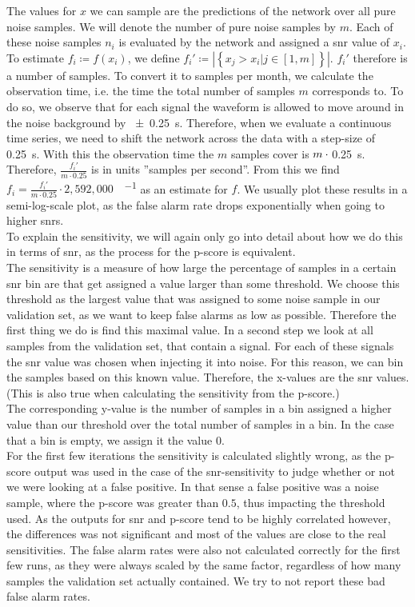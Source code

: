 The values for $x$ we can sample are the predictions of the network over all pure noise samples. We will denote the number of pure noise samples by $m$. Each of these noise samples $n_i$ is evaluated by the network and assigned a \gls{snr} value of $x_i$. To estimate $f_i\coloneqq f(x_i)$, we define $f_i'\coloneqq \left|\left\{ x_j > x_i | j\in \left[1, m\right]\right\}\right|$. $f_i'$ therefore is a number of samples. To convert it to samples per month, we calculate the observation time, i.e. the time the total number of samples $m$ corresponds to. To do so, we observe that for each signal the waveform is allowed to move around in the noise background by \SI{\pm 0.25}{\s}. Therefore, when we evaluate a continuous time series, we need to shift the network across the data with a step-size of \SI{0.25}{\s}. With this the observation time the $m$ samples cover is $m\cdot\vphantom{0.25}$\SI{0.25}{\s}. Therefore, $\frac{f_i'}{m\cdot 0.25}$ is in units ''samples per second''. From this we find $f_i=\frac{f_i'}{m\cdot 0.25}\cdot2,592,000$\SI[per-mode=fraction]{}{\samples\per\month} as an estimate for $f$. We usually plot these results in a semi-log-scale plot, as the false alarm rate drops exponentially when going to higher \gls{snr}s.\\
To explain the sensitivity, we will again only go into detail about how we do this in terms of \gls{snr}, as the process for the p-score is equivalent.\\
The sensitivity is a measure of how large the percentage of samples in a certain \gls{snr} bin are that get assigned a value larger than some threshold. We choose this threshold as the largest value that was assigned to some noise sample in our validation set, as we want to keep false alarms as low as possible. Therefore the first thing we do is find this maximal value. In a second step we look at all samples from the validation set, that contain a signal. For each of these signals the \gls{snr} value was chosen when injecting it into noise. For this reason, we can bin the samples based on this known value. Therefore, the x-values are the \gls{snr} values. (This is also true when calculating the sensitivity from the p-score.)\\
The corresponding y-value is the number of samples in a bin assigned a higher value than our threshold over the total number of samples in a bin. In the case that a bin is empty, we assign it the value 0.\\
For the first few iterations the sensitivity is calculated slightly wrong, as the p-score output was used in the case of the \gls{snr}-sensitivity to judge whether or not we were looking at a false positive. In that sense a false positive was a noise sample, where the p-score was greater than $0.5$, thus impacting the threshold used. As the outputs for \gls{snr} and p-score tend to be highly correlated however, the differences was not significant and most of the values are close to the real sensitivities. The false alarm rates were also not calculated correctly for the first few runs, as they were always scaled by the same factor, regardless of how many samples the validation set actually contained. We try to not report these bad false alarm rates.\medskip\\
